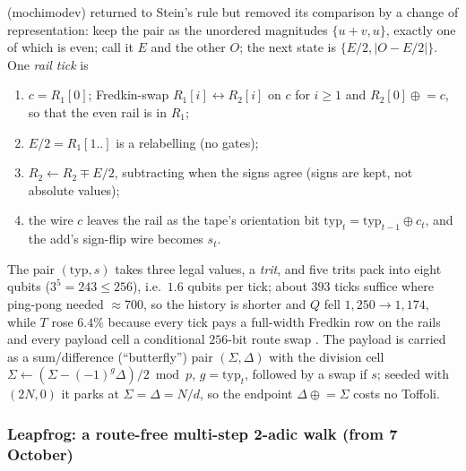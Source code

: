  (mochimodev) returned to Stein's rule but removed its comparison by a change of representation: keep the pair as the unordered magnitudes $\{u+v,u\}$, exactly one of which is even; call it $E$ and the other $O$; the next state is $\{E/2,|O-E/2|\}$. One \emph{rail tick} is
\begin{enumerate}[nosep]
\item $c=R_1[0]$; Fredkin-swap $R_1[i]\leftrightarrow R_2[i]$ on $c$ for $i\ge1$ and $R_2[0]\mathrel{\oplus}=c$, so that the even rail is in $R_1$;
\item $E/2=R_1[1..]$ is a relabelling (no gates);
\item $R_2\gets R_2\mp E/2$, subtracting when the signs agree (signs are kept, not absolute values);
\item the wire $c$ leaves the rail as the tape's orientation bit $\mathrm{typ}_t=\mathrm{typ}_{t-1}\oplus c_t$, and the add's sign-flip wire becomes $s_t$.
\end{enumerate}
The pair $(\mathrm{typ},s)$ takes three legal values, a \emph{trit}, and five trits pack into eight qubits ($3^5=243\le256$), i.e.\ $1.6$ qubits per tick; about $393$ ticks suffice where ping-pong needed $\approx700$, so the history is shorter and $Q$ fell $1{,}250\to1{,}174$, while $T$ rose $6.4\%$ because every tick pays a full-width Fredkin row on the rails and every payload cell a conditional $256$-bit route swap \cite{ecdsafail-wiki}. The payload is carried as a sum/difference (``butterfly'') pair $(\Sigma,\Delta)$ with the division cell $\Sigma\gets(\Sigma-(-1)^{g}\Delta)/2\bmod p$, $g=\mathrm{typ}_t$, followed by a swap if $s$; seeded with $(2N,0)$ it parks at $\Sigma=\Delta=N/d$, so the endpoint $\Delta\mathrel{\oplus}=\Sigma$ costs no Toffoli.

\subsubsection{Leapfrog: a route-free multi-step 2-adic walk (from 7 October)}\label{sec:leapfrog}

